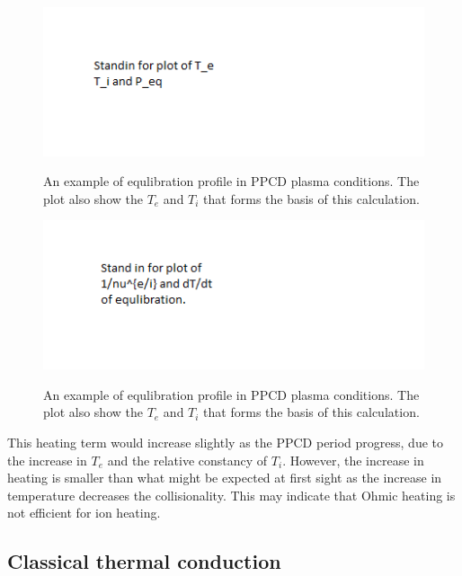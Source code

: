 \begin{refsection}
\begin{figure}[!htb]
	\centering
	\includegraphics[width = 0.75\linewidth]{./transport_modeling/p_eq.png}
    \label{fig:P_eq}
    \caption[Example equlibration power profile.]{An example of equlibration profile in PPCD plasma conditions. The plot also show the $T_e$ and $T_i$ that forms the basis of this calculation.}
\end{figure}%

\begin{figure}[!htb]
	\centering
	\includegraphics[width = 0.75\linewidth]{./transport_modeling/tau_eq.png}
    \label{fig:P_eq}
    \caption[Electron ion thermal equlibration time]{An example of equlibration profile in PPCD plasma conditions. The plot also show the $T_e$ and $T_i$ that forms the basis of this calculation.}
\end{figure}%

This heating term would increase slightly as the PPCD period progress, due to the increase in $T_e$ and the relative constancy of $T_i$. However, the increase in heating is smaller than what might be expected at first sight as the increase in temperature decreases the collisionality. This may indicate that Ohmic heating is not efficient for ion heating. 

\subsection{Classical thermal conduction}\label{sec:thermal_cond}


\end{refsection}
